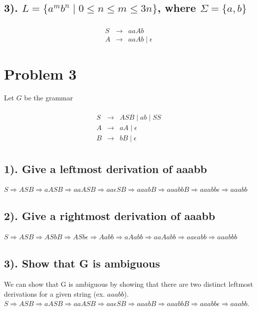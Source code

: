 \documentclass[20pt]{article} %
\begin{document}
\subsection{3). $L = \{a^{m}b^{n} \mid 0 \leq n \leq m \leq 3n\}$, where $\Sigma = \{a,b\}$}
 \begin{table}[!htbp]
 \[\begin{array}{ccc} 
&  \\
 S & \rightarrow & aaAb \\
 A & \rightarrow & aaAb \mid \epsilon 
 \end{array}\]
 \end{table}
\section{Problem 3}
Let $G$ be the grammar
 \begin{table}[!htbp]
 \[\begin{array}{ccc} 
&  \\
 S & \rightarrow & ASB \mid ab \mid SS\\
 A & \rightarrow & aA \mid \epsilon \\
 B & \rightarrow  & bB \mid \epsilon \\
 \end{array}\]
 \end{table}
\subsection{1). Give a leftmost derivation of aaabb}
$S \Rightarrow ASB \Rightarrow aASB \Rightarrow aaASB \Rightarrow aa\epsilon SB \Rightarrow aaabB \Rightarrow aaabbB \Rightarrow aaabb\epsilon \Rightarrow aaabb$
\subsection{2). Give a rightmost derivation of aaabb}
$S \Rightarrow ASB \Rightarrow ASbB \Rightarrow ASb\epsilon \Rightarrow Aabb \Rightarrow aAabb \Rightarrow aaAabb \Rightarrow aa\epsilon abb \Rightarrow aaabbb$
\subsection{3). Show that G is ambiguous}
We can show that G is ambiguous by showing that there are two distinct leftmost derivations for a given string (ex. $aaabb$).  \\



$S \Rightarrow ASB \Rightarrow aASB \Rightarrow aaASB \Rightarrow aa\epsilon SB \Rightarrow aaabB \Rightarrow aaabbB \Rightarrow aaabb\epsilon \Rightarrow aaabb$. \\
\end{document}

